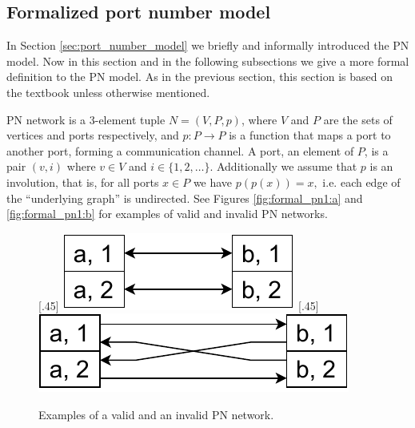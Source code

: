 \subsection{Formalized port number model} \label{sec:formalized_pn_model}
In Section \ref{sec:port_number_model} we briefly and informally introduced the PN model.
Now in this section and in the following subsections we give a more formal definition to the PN model.
As in the previous section, this section is based on the textbook \cite{HirvonenSuomelaDistAlg2020} unless otherwise mentioned.

PN network is a 3-element tuple $N = (V, P, p)$, where $V$ and $P$ are the sets of vertices and ports respectively, and $p\colon P \rightarrow P$ is a function that maps a port to another port, forming a communication channel.
A port, an element of $P$, is a pair $(v, i)$ where $v \in V$ and $i \in \{1, 2, \dotsc\}$.
Additionally we assume that $p$ is an involution, that is, for all ports $x \in P$ we have $p(p(x)) = x, $ i.e. each edge of the ``underlying graph'' is undirected.
See Figures \ref{fig:formal_pn1:a} and \ref{fig:formal_pn1:b} for examples of valid and invalid PN networks.

\begin{figure}[H]
    [.45\linewidth] {
    \centering
    \includegraphics[scale=0.6]{diagrams/formalizing_pn_network_diagram1.pdf}
  }
  \hfill
    [.45\linewidth] {
    \centering
    \includegraphics[scale=0.6]{diagrams/formalizing_pn_network_diagram2.pdf}
  }
  \caption{Examples of a valid and an invalid PN network.}
  \label{fig:formal_pn1}
\end{figure}


